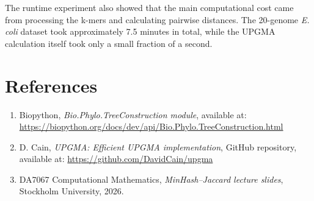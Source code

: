\documentclass[11pt,a4paper]{article}
\begin{document}
The runtime experiment also showed that the main computational cost came
from processing the k-mers and calculating pairwise distances. The
20-genome \textit{E. coli} dataset took approximately 7.5 minutes in
total, while the UPGMA calculation itself took only a small fraction of
a second.



\newpage
\section{References}

\begin{enumerate}

\item Biopython, \textit{Bio.Phylo.TreeConstruction module},
available at: \url{https://biopython.org/docs/dev/api/Bio.Phylo.TreeConstruction.html}

\item D. Cain, \textit{UPGMA: Efficient UPGMA implementation},
GitHub repository,
available at: \url{https://github.com/DavidCain/upgma}


\item
DA7067 Computational Mathematics,
\emph{MinHash--Jaccard lecture slides},
Stockholm University, 2026.

\end{enumerate}
\end{document}
